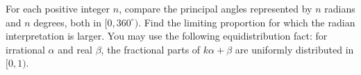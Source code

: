 For each positive integer $n$, compare the principal angles represented by $n$ radians and $n$ degrees, both in $[0,360^\circ)$. Find the limiting proportion for which the radian interpretation is larger. You may use the following equidistribution fact: for irrational $\alpha$ and real $\beta$, the fractional parts of $k\alpha+\beta$ are uniformly distributed in $[0,1)$.
